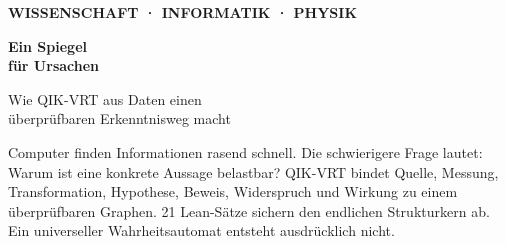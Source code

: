 \documentclass[10pt,a4paper]{article}
\begin{document}
\thispagestyle{empty}
\vspace*{9mm}\color{white}
{\sffamily\small\bfseries\color{Sun} WISSENSCHAFT · INFORMATIK · PHYSIK\par}
\vspace{8mm}
{\sffamily\fontsize{29}{34}\selectfont\bfseries Ein Spiegel\\für Ursachen\par}
\vspace{5mm}
{\Large Wie QIK-VRT aus Daten einen\\überprüfbaren Erkenntnisweg macht\par}
\vspace{8mm}{\sffamily Ingolf Lohmann\par}
\vspace{19mm}\color{black}

\begin{keybox}
Computer finden Informationen rasend schnell. Die schwierigere Frage lautet:
Warum ist eine konkrete Aussage belastbar? QIK-VRT bindet Quelle, Messung,
Transformation, Hypothese, Beweis, Widerspruch und Wirkung zu einem
überprüfbaren Graphen. 21 Lean-Sätze sichern den endlichen Strukturkern ab.
Ein universeller Wahrheitsautomat entsteht ausdrücklich nicht.
\end{keybox}
\end{document}
